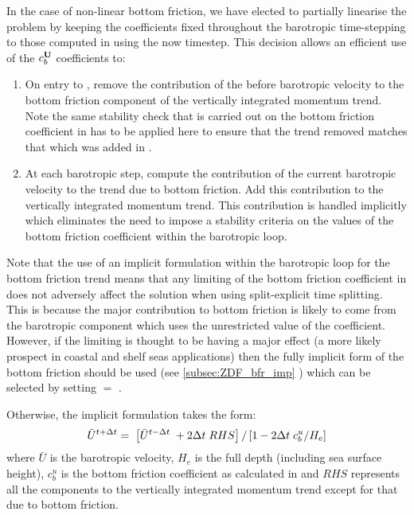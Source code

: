 \documentclass[../tex_main/NEMO_manual]{subfiles}
\begin{document}
In the case of non-linear bottom friction, we have elected to partially linearise 
the problem by keeping the coefficients fixed throughout the barotropic 
time-stepping to those computed in  using the now timestep. 
This decision allows an efficient use of the $c_b^{\mathbf{U}}$ coefficients to:

\begin{enumerate}
\item On entry to , remove the contribution of the before
barotropic velocity to the bottom friction component of the vertically
integrated momentum trend. Note the same stability check that is carried out 
on the bottom friction coefficient in  has to be applied here to
ensure that the trend removed matches that which was added in .
\item At each barotropic step, compute the contribution of the current barotropic
velocity to the trend due to bottom friction. Add this contribution to the
vertically integrated momentum trend. This contribution is handled implicitly which
eliminates the need to impose a stability criteria on the values of the bottom friction
coefficient within the barotropic loop. 
\end{enumerate}

Note that the use of an implicit formulation within the barotropic loop
for the bottom friction trend means that any limiting of the bottom friction coefficient 
in  does not adversely affect the solution when using split-explicit time 
splitting. This is because the major contribution to bottom friction is likely to come from 
the barotropic component which uses the unrestricted value of the coefficient. However, if the
limiting is thought to be having a major effect (a more likely prospect in coastal and shelf seas
applications) then the fully implicit form of the bottom friction should be used (see \autoref{subsec:ZDF_bfr_imp} ) 
which can be selected by setting  $=$ .

Otherwise, the implicit formulation takes the form:
\begin{equation} \label{eq:zdfbfr_implicitts}
 \bar{U}^{t+ \Delta t} = \; \left [ \bar{U}^{t-\Delta t}\; + 2 \Delta t\;RHS \right ] / \left [ 1 - 2 \Delta t \;c_b^{u} / H_e \right ]  
\end{equation}
where $\bar U$ is the barotropic velocity, $H_e$ is the full depth (including sea surface height), 
$c_b^u$ is the bottom friction coefficient as calculated in  and $RHS$ represents 
all the components to the vertically integrated momentum trend except for that due to bottom friction.
\end{document}
